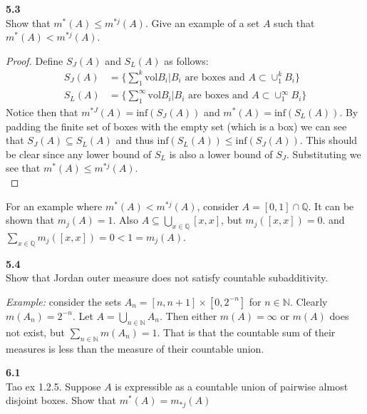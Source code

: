 \documentclass[12pt]{article}
\newcommand{\problem}[1]{\hspace{-4 ex} \large \textbf{#1}\\}
\begin{document}
\problem{5.3} Show that $m^*(A)\leq m^{*j}(A)$. Give an example of a set $A$ such that $m^*(A)<m^{*j}(A)$.
	
	\begin{proof}
		Define $S_J(A)$ and $S_L(A)$ as follows:
		\begin{align*}
			S_J(A) & = \Bigg\{\sum_1^k\text{vol}B_i \Bigg \vert B_i \text{ are boxes and } A \subset \cup_1^k B_i \Bigg\} \\
			S_L(A) & = \Bigg\{\sum_1^\infty\text{vol}B_i \Bigg \vert B_i \text{ are boxes and } A \subset \cup_1^\infty B_i \Bigg\}
		\end{align*}
	Notice then that $m^{*J}(A) = \text{inf}(S_J(A))$ and $m^{*}(A) = \text{inf}(S_L(A))$. By padding the finite set of boxes with the empty set (which is a box) we can see that $S_J(A) \subseteq S_L(A)$ and thus $\text{inf}(S_L(A)) \leq \text{inf}(S_J(A))$. This should be clear since any lower bound of $S_L$ is also a lower bound of $S_J$. Substituting we see that $m^*(A)\leq m^{*j}(A)$. \\
	\end{proof}
	
	For an example where $m^*(A)<m^{*j}(A)$, consider $A = [0,1] \cap \mathbb{Q}$. It can be shown that $m_j(A)=1$. Also $A \subseteq \bigcup\limits_{x \in \mathbb{Q}}[x,x]$, but $m_j([x,x])=0$. and $\sum\limits_{x \in \mathbb{Q}}m_j([x,x]) = 0 < 1 = m_j(A)$. 
	


\problem{5.4} Show that Jordan outer measure does not satisfy countable subadditivity.

	\textit{Example:} consider the sets $A_n = [n,n+1] \times [0, 2^{-n}]$ for $n \in \mathbb{N}$. Clearly $m(A_n) = 2^{-n}$. Let $A = \bigcup\limits_{n \in \mathbb{N}}A_n$. Then either $m(A) = \infty$ or $m(A)$ does not exist, but $\sum\limits_{n \in \mathbb{N}}m(A_n) = 1$. That is that the countable sum of their measures is less than the measure of their countable union.



\problem{6.1}Tao ex 1.2.5. Suppose $A$ is expressible as a countable union of pairwise almost disjoint boxes. Show that $m^*(A)=m_{*j}(A)$
\end{document}
